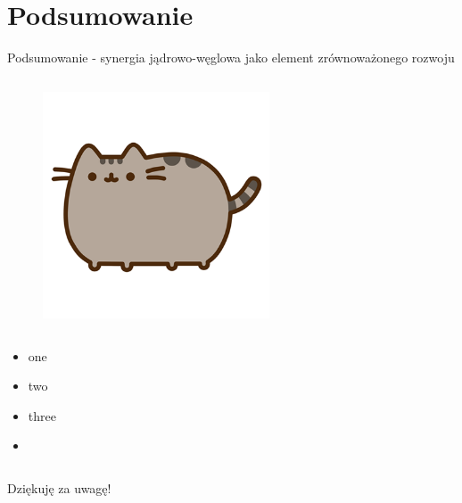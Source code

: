 \section{Podsumowanie}

\begin{columnframe}{Podsumowanie - synergia jądrowo-węglowa jako element zrównoważonego rozwoju}
    \begin{column}{0.5\textwidth}
        \begin{figure}
            \centering
            \includegraphics[width=0.6\textwidth, frame]{images/pusheen.png}
        \end{figure}
    \end{column}
    \begin{column}{0.5\textwidth}
        \begin{itemize}
            \item one \keV
            \item two \MeV
            \item three \GeV
            \item \aegis
        \end{itemize}
    \end{column}
\end{columnframe}


\begin{frame}{Dziękuję za uwagę!}
\end{frame}